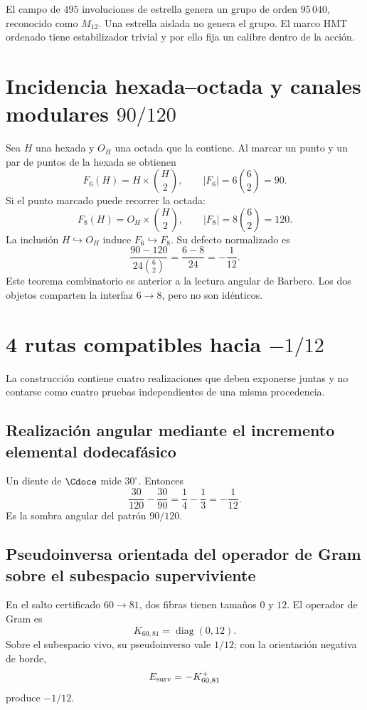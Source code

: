 El campo de \(495\) involuciones de estrella genera un grupo de orden
\(95\,040\), reconocido como \(M_{12}\). Una estrella aislada no genera el
grupo. El marco HMT ordenado tiene estabilizador trivial y por ello fija un
calibre dentro de la acción.

\section{Incidencia hexada--octada y canales modulares \(90/120\)}

Sea \(H\) una hexada y \(O_H\) una octada que la contiene. Al marcar un punto
y un par de puntos de la hexada se obtienen
\[
F_6(H)=H\times\binom H2,
\qquad
|F_6|=6\binom62=90.
\]
Si el punto marcado puede recorrer la octada:
\[
F_8(H)=O_H\times\binom H2,
\qquad
|F_8|=8\binom62=120.
\]
La inclusión \(H\hookrightarrow O_H\) induce \(F_6\hookrightarrow F_8\).
Su defecto normalizado es
\[
\boxed{
\frac{90-120}{24\binom62}
=\frac{6-8}{24}
=-\frac1{12}.}
\]
Este teorema combinatorio es anterior a la lectura angular de Barbero. Los
dos objetos comparten la interfaz \(6\to8\), pero no son idénticos.

\section{4 rutas compatibles hacia \texorpdfstring{\(-1/12\)}{-1/12}}

La construcción contiene cuatro realizaciones que deben exponerse juntas y no
contarse como cuatro pruebas independientes de una misma procedencia.

\subsection{Realización angular mediante el incremento elemental dodecafásico}

Un diente de \(\Cdoce\) mide \(30^\circ\). Entonces
\[
\frac{30}{120}-\frac{30}{90}
=\frac14-\frac13
=-\frac1{12}.
\]
Es la sombra angular del patrón \(90/120\).

\subsection{Pseudoinversa orientada del operador de Gram sobre el subespacio superviviente}

En el salto certificado \(60\to81\), dos fibras tienen tamaños \(0\) y
\(12\). El operador de Gram es
\[
K_{60,81}=\operatorname{diag}(0,12).
\]
Sobre el subespacio vivo, su pseudoinverso vale \(1/12\); con la orientación
negativa de borde,
\[
E_{\rm surv}=-K_{60,81}^{+}
\]
produce \(-1/12\).

